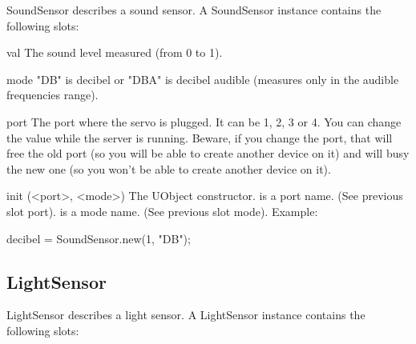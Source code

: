 SoundSensor describes a sound sensor. A SoundSensor instance contains the
following slots:

\begin{urbiscriptapi}

\item[val] The sound level measured (from 0 to 1).

\item[mode] "DB" is decibel or "DBA" is decibel audible (measures only in
  the audible frequencies range).

\item[port] The port where the servo is plugged. It can be 1, 2, 3 or 4. You
  can change the value while the server is running. Beware, if you change
  the port, that will free the old port (so you will be able to create
  another device on it) and will busy the new one (so you won't be able to
  create another device on it).


\item[init](<port>, <mode>) The UObject constructor.  is a port
  name. (See previous slot port).  is a mode name. (See
  previous slot mode). Example:
\begin{urbiunchecked}
decibel = SoundSensor.new(1, "DB");
\end{urbiunchecked}

\end{urbiscriptapi}

\subsection{LightSensor}

LightSensor describes a light sensor. A LightSensor instance contains the
following slots:

